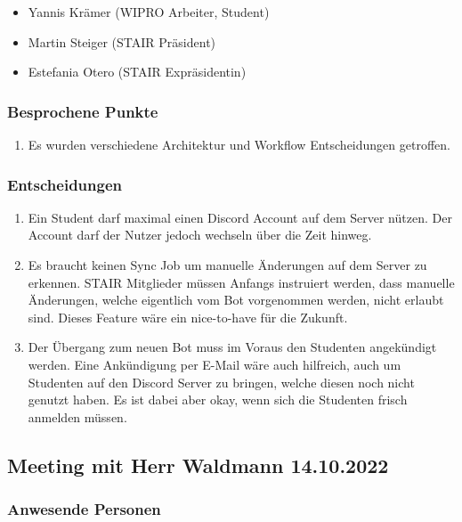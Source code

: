 \documentclass[a4paper, table]{article}
\begin{document}
\begin{itemize}
    \item Yannis Krämer (WIPRO Arbeiter, Student)
    \item Martin Steiger (STAIR Präsident)
    \item Estefania Otero (STAIR Expräsidentin)
\end{itemize}

\subsubsection*{Besprochene Punkte}

\begin{enumerate}
    \item Es wurden verschiedene Architektur und Workflow Entscheidungen getroffen.
\end{enumerate}

\subsubsection*{Entscheidungen}

\begin{enumerate}
    \item Ein Student darf maximal einen Discord Account auf dem Server nützen. Der Account darf der Nutzer jedoch wechseln über die Zeit hinweg.
    \item Es braucht keinen Sync Job um manuelle Änderungen auf dem Server zu erkennen. STAIR Mitglieder müssen Anfangs instruiert werden, dass manuelle Änderungen, welche eigentlich vom Bot vorgenommen werden, nicht erlaubt sind. Dieses Feature wäre ein nice-to-have für die Zukunft.
    \item Der Übergang zum neuen Bot muss im Voraus den Studenten angekündigt werden. Eine Ankündigung per E-Mail wäre auch hilfreich, auch um Studenten auf den Discord Server zu bringen, welche diesen noch nicht genutzt haben. Es ist dabei aber okay, wenn sich die Studenten frisch anmelden müssen.
\end{enumerate}

\newpage
\subsection{Meeting mit Herr Waldmann 14.10.2022}

\subsubsection*{Anwesende Personen}
\end{document}

